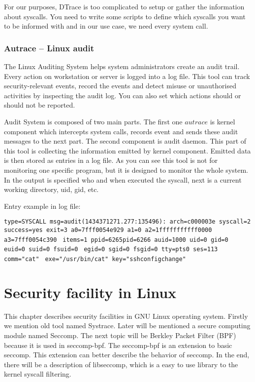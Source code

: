 For our purposes, DTrace is too complicated to setup or gather the information about syscalls.
You need to write some scripts to define which syscalls you want to be informed with and in our use case, we need every system call.

\subsection{Autrace -- Linux audit}
The Linux Auditing System helps system administrators create an audit trail.
Every action on workstation or server is logged into a log file.
This tool can track security-relevant events, record the events and detect misuse or unauthorised activities by inspecting the audit log.
You can also set which actions should or should not be reported.

Audit System is composed of two main parts.
The first one \(autrace\) is kernel component which intercepts system calls, records event and sends these audit messages to the next part.
The second component is audit daemon.
This part of this tool is collecting the information emitted by kernel component.
Emitted data is then stored as entries in a log file.
As you can see this tool is not for monitoring one specific program, but it is designed to monitor the whole system.
In the output is specified who and when executed the syscall, next is a current working directory, uid, gid, etc.

Entry example in log file:

\noindent
\texttt{type=SYSCALL msg=audit(1434371271.277:135496): arch=c000003e syscall=2}\linebreak
\texttt{success=yes exit=3 a0=7fff0054e929 a1=0 a2=1fffffffffff0000 a3=7fff0054c390 }\linebreak
\texttt{items=1 ppid=6265pid=6266 auid=1000 uid=0 gid=0 euid=0 suid=0 fsuid=0 }\linebreak
\texttt{egid=0 sgid=0 fsgid=0 tty=pts0 ses=113 comm="cat" }\linebreak
\texttt{exe="/usr/bin/cat" key="sshconfigchange"}



\chapter{Security facility in Linux}
This chapter describes security facilities in GNU Linux operating system.
Firstly we mention old tool named Systrace\cite{systrace_web}.
Later will be mentioned a secure computing module named Seccomp\cite{seccomp_sandbox}.
The next topic will be Berkley Packet Filter (BPF) because it is used in seccomp-bpf.
The seccomp-bpf is an extension to basic seccomp.
This extension can better describe the behavior of seccomp.
In the end, there will be a description of libseccomp, which is a easy to use library to the kernel syscall filtering.


